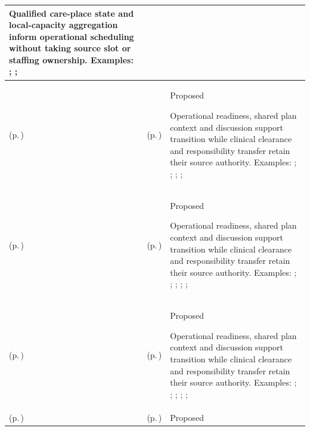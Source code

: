 \begin{longtable}{|>{\raggedright\arraybackslash}p{0.27\TableWidth}|>{\raggedright\arraybackslash}p{0.27\TableWidth}|>{\raggedright\arraybackslash}p{0.46\TableWidth}|}
Qualified care-place state and local-capacity aggregation inform operational scheduling without taking source slot or staffing ownership. Examples: \nameref{feature:feat-hso-15}; \nameref{function:aggregate-service-capacity-telemetry}; \nameref{service:regional-health-system-capacity-query}\\\hline
\nameref{cap:bc-care-coordination-transition} (p.\,\pageref{cap:bc-care-coordination-transition}) & \nameref{cap:bec-discharge-management} (p.\,\pageref{cap:bec-discharge-management}) & Proposed

Operational readiness, shared plan context and discussion support transition while clinical clearance and responsibility transfer retain their source authority. Examples: \nameref{feature:feat-hso-27}; \nameref{feature:feat-hso-28}; \nameref{feature:feat-hso-29}; \nameref{function:manage-discharge-coordination-progression}; \nameref{service:discharge-readiness-telemetry}\\\hline
\nameref{cap:bc-care-coordination-transition} (p.\,\pageref{cap:bc-care-coordination-transition}) & \nameref{cap:bec-clinical-collaboration} (p.\,\pageref{cap:bec-clinical-collaboration}) & Proposed

Operational readiness, shared plan context and discussion support transition while clinical clearance and responsibility transfer retain their source authority. Examples: \nameref{feature:feat-ise-16}; \nameref{feature:feat-ise-17}; \nameref{feature:feat-ise-18}; \nameref{function:coordinate-care-team-collaboration}; \nameref{service:clinical-collaboration-space-service}; \nameref{function:resolve-lhr-query-within-collaboration}\\\hline
\nameref{cap:bc-care-coordination-transition} (p.\,\pageref{cap:bc-care-coordination-transition}) & \nameref{cap:bec-care-plan-administration} (p.\,\pageref{cap:bec-care-plan-administration}) & Proposed

Operational readiness, shared plan context and discussion support transition while clinical clearance and responsibility transfer retain their source authority. Examples: \nameref{feature:feat-sa-26}; \nameref{function:receive-care-plan}; \nameref{service:care-plan-ingress}; \nameref{function:associate-care-plan-context}; \nameref{service:care-plan-context-query}; \nameref{function:distribute-care-plan-change}\\\hline
\nameref{cap:bc-care-support-logistics-management} (p.\,\pageref{cap:bc-care-support-logistics-management}) & \nameref{cap:bec-patient-transport} (p.\,\pageref{cap:bec-patient-transport}) & Proposed


\end{longtable}
